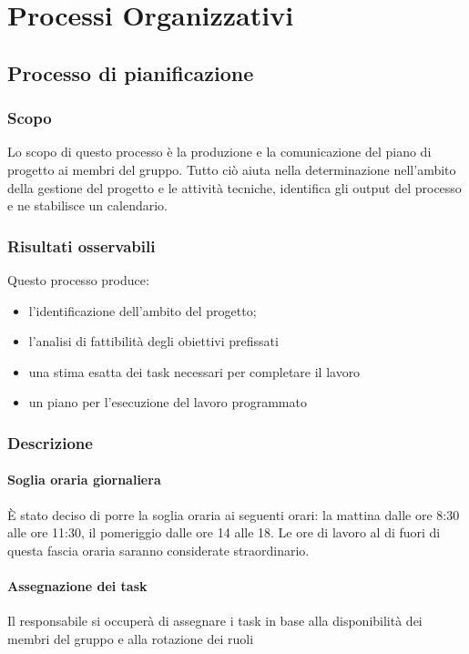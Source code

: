 \section{Processi Organizzativi}

\subsection{Processo di pianificazione}

\subsubsection{Scopo}

Lo scopo di questo processo è la produzione e la comunicazione del piano di progetto ai membri del gruppo. Tutto ciò aiuta nella determinazione nell'ambito della gestione del progetto e le attività tecniche, identifica gli output del processo e ne stabilisce un calendario.


\subsubsection{Risultati osservabili}

Questo processo produce:
\begin{itemize}

\item l'identificazione dell'ambito del progetto;
\item l'analisi di fattibilità degli obiettivi prefissati
\item una stima esatta dei task necessari per completare il lavoro
\item un piano per l'esecuzione del lavoro programmato

\end{itemize}

\subsubsection{Descrizione}

\paragraph*{Soglia oraria giornaliera}È stato deciso di porre la soglia oraria ai seguenti orari: la mattina dalle ore 8:30 alle ore 11:30, il pomeriggio dalle ore 14 alle 18. Le ore di lavoro al di fuori di questa fascia oraria saranno considerate straordinario.

\paragraph*{Assegnazione dei task}Il responsabile si occuperà di assegnare i task in base alla disponibilità dei membri del gruppo e alla rotazione dei ruoli

